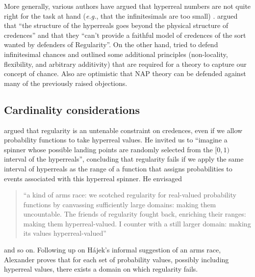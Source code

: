 More generally, various authors have argued that hyperreal numbers are not quite right for the task at hand (\textit{e.g.}, that the infinitesimals are too small) \citep{Easwaran:2014,Pruss:2014}. \citet[pp.~34--35]{Easwaran:2014} argued that ``the structure of the hyperreals goes beyond the physical structure of credences'' and that they ``can't provide a faithful model of credences of the sort wanted by defenders of Regularity''.
On the other hand, \citet{Hofweber:2014} tried to defend infinitesimal chances and outlined some additional principles (non-locality, flexibility, and arbitrary additivity) that are required for a theory to capture our concept of chance. Also \citet{Benci_etal:2018} are optimistic that NAP theory can be defended against many of the previously raised objections.

\subsection{Cardinality considerations}
\citet{Hajek:2012b} argued that regularity is an untenable constraint on credences, even if we allow probability functions to take hyperreal values. He invited us to ``imagine a spinner whose possible landing points are randomly selected from the $[0, 1)$ interval of the hyperreals'', concluding that regularity fails if we apply the same interval of hyperreals as the range of a function that assigns probabilities to events associated with this hyperreal spinner.
He envisaged
\begin{quote}
``a kind of arms race: we scotched regularity for real-valued probability functions by canvassing sufficiently large domains: making them uncountable. The friends of regularity fought back, enriching their ranges: making them hyperreal-valued. I counter with a still larger domain: making its values hyperreal-valued''
\end{quote}
and so on. Following up on H{\'a}jek's informal suggestion of an arms race, Alexander \citet{Pruss:2013} proves that for each set of probability values, possibly including hyperreal values, there exists a domain on which regularity fails.

